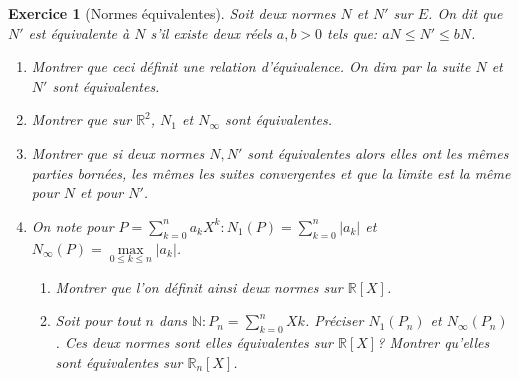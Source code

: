 \documentclass[12pt,a4paper]{article}
\newcommand{\R}{\mathbb{R}}
\newcommand{\N}{\mathbb{N}}
\theoremstyle{break}
\theoremstyle{break}
\newtheorem{Exo}{Exercice}
\begin{document}
 \begin{Exo}[Normes équivalentes]
 	Soit deux normes $N$ et $N'$ sur $E$. On dit que $N'$ est  équivalente à $N$ s'il existe deux réels $a,b>0$ tels que: $aN\leqslant N'\leqslant bN$.
\begin{enumerate}
	\item Montrer que ceci définit une relation d'équivalence. On dira par la suite $N$ et $N'$ sont équivalentes.
	\item
	Montrer que sur $\R^2$,  $N_1$ et $N_{\infty}$  sont équivalentes.
	\item
	Montrer que si deux normes $N,N'$ sont équivalentes alors elles ont les mêmes parties bornées, les mêmes les suites convergentes  et que la limite est la même pour $N$ et pour $N'$.
	\item 
	
		On note pour $P=\displaystyle\sum_{k=0}^na_kX^k:N_1(P)=\displaystyle\sum_{k=0}^n|a_k|$ et $N_{\infty}(P)=\displaystyle \underset{0\leqslant k\leqslant n}\max{|a_k|}$.
	\begin{enumerate}
		\item
		Montrer que l'on définit ainsi deux normes sur $\R[X]$.
		\item
		Soit pour tout $n$ dans $\N:P_n=\displaystyle\sum_{k=0}^nXk$. Préciser $N_1(P_n)$ et $N_{\infty}(P_n)$. Ces deux normes sont elles équivalentes sur $\R[X]$? Montrer qu'elles sont équivalentes sur $\R_n[X]$.
	\end{enumerate}
	
%	
\end{enumerate}
 \end{Exo}
\end{document}
